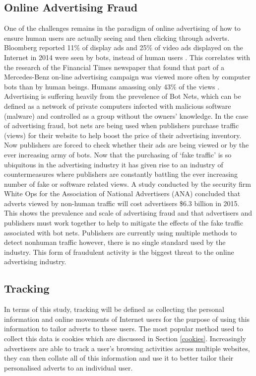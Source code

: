 \documentclass{article}
\begin{document}
\subsection{Online Advertising Fraud}
One of the challenges remains in the paradigm of online advertising of how to ensure human users are actually seeing and then clicking through adverts. Bloomberg reported 11\% of display ads and 25\% of video ads displayed on the Internet in 2014 were seen by bots, instead of human users \parencite{bloomFraud}. This correlates with the research of the Financial Times newspaper that found that part of a Mercedes-Benz on-line advertising campaign was viewed more often by computer bots than by human beings. Humans amassing only 43\% of the views \parencite{mercFraud}. Advertising is suffering heavily from the prevelence of Bot Nets, which can be defined as a network of private computers infected with malicious software (malware)  and controlled as a group without the owners' knowledge. In the case of advertising fraud, bot nets are being used when publishers purchase traffic (views) for their website to help boost the price of their advertising inventory. Now publishers are forced to check whether their ads are being viewed or by the ever increasing army of bots. Now that the purchasing of `fake traffic' is so ubiquitous in the advertising industry it has given rise to an industry of countermeasures \parencite{bloomFraud} where publishers are constantly battling the ever increasing number of fake or software related views. A study conducted by the security firm White Ops for the Association of National Advertisers (ANA) concluded that adverts viewed by non-human traffic will cost advertisers \$6.3 billion in 2015. This shows the prevalence and scale of advertising fraud and that advertisers and publishers must work together to help to mitigate the effects of the fake traffic associated with bot nets. Publishers are currently using multiple methods to detect nonhuman traffic however, there is no single standard used by the industry. This form of fraudulent activity is the biggest threat to the online advertising industry. 


\subsection{Tracking}
In terms of this study, tracking will be defined as collecting the personal information and online movements of Internet users for the purpose of using this information to tailor adverts to these users. The most popular method used to collect this data is cookies which are discussed in Section \ref{cookies}. Increasingly advertisers are able to track a user's browsing activities across multiple websites, they can then collate all of this information and use it to better tailor their personalised adverts to an individual user. 
\end{document}
